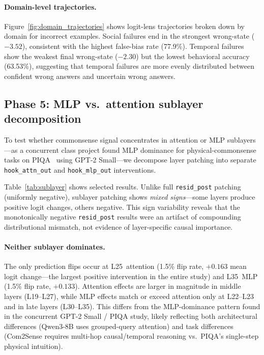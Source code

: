 \documentclass{article}
\begin{document}
\paragraph{Domain-level trajectories.}
Figure~\ref{fig:domain_trajectories} shows logit-lens trajectories broken down by domain for incorrect examples.
Social failures end in the strongest wrong-state ($-3.52$), consistent with the highest false-bias rate (77.9\%).
Temporal failures show the weakest final wrong-state ($-2.30$) but the lowest behavioral accuracy (63.53\%), suggesting that temporal failures are more evenly distributed between confident wrong answers and uncertain wrong answers.

\subsection{Phase 5: MLP vs.\ attention sublayer decomposition}

To test whether commonsense signal concentrates in attention or MLP sublayers---as a concurrent class project found MLP dominance for physical-commonsense tasks on PIQA~\citep{bisk2020piqa} using GPT-2 Small---we decompose layer patching into separate \texttt{hook\_attn\_out} and \texttt{hook\_mlp\_out} interventions.

Table~\ref{tab:sublayer} shows selected results.
Unlike full \texttt{resid\_post} patching (uniformly negative), sublayer patching shows \emph{mixed signs}---some layers produce positive logit changes, others negative.
This sign variability reveals that the monotonically negative \texttt{resid\_post} results were an artifact of compounding distributional mismatch, not evidence of layer-specific causal importance.

\paragraph{Neither sublayer dominates.}
The only prediction flips occur at L25~attention (1.5\% flip rate, $+0.163$ mean logit change---the largest positive intervention in the entire study) and L35~MLP (1.5\% flip rate, $+0.133$).
Attention effects are larger in magnitude in middle layers (L19--L27), while MLP effects match or exceed attention only at L22--L23 and in late layers (L30--L35).
This differs from the MLP-dominance pattern found in the concurrent GPT-2 Small / PIQA study, likely reflecting both architectural differences (Qwen3-8B uses grouped-query attention) and task differences (Com2Sense requires multi-hop causal/temporal reasoning vs.\ PIQA's single-step physical intuition).
\end{document}
